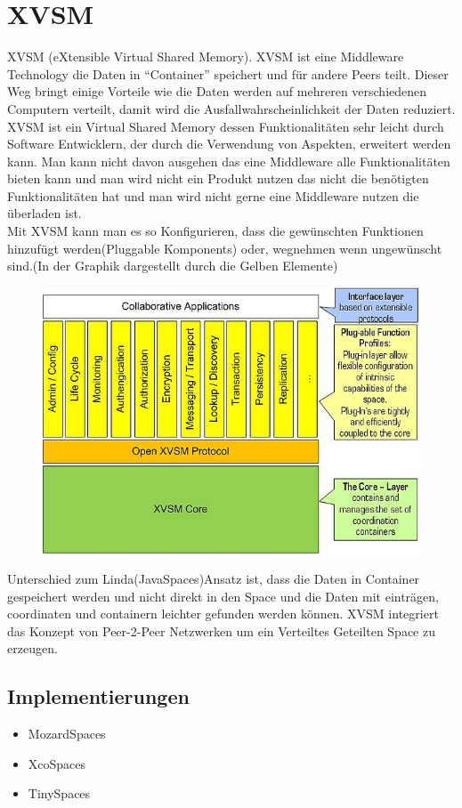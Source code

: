 \documentclass[a4paper,12pt]{scrreprt}
\begin{document}
		\section{XVSM}
		XVSM (eXtensible Virtual Shared Memory). XVSM ist eine Middleware Technology die Daten in “Container” speichert  und für andere Peers teilt. Dieser Weg bringt einige Vorteile wie die Daten werden auf mehreren verschiedenen Computern verteilt, damit wird die Ausfallwahrscheinlichkeit der Daten reduziert.\\
		
		XVSM ist ein Virtual Shared Memory dessen Funktionalitäten sehr leicht durch Software Entwicklern, der durch die Verwendung von Aspekten, erweitert werden kann. Man kann nicht davon ausgehen das eine Middleware alle Funktionalitäten bieten kann und man wird nicht ein Produkt nutzen das nicht die benötigten Funktionalitäten hat und man wird nicht gerne eine Middleware nutzen die überladen ist.\\
		Mit XVSM kann man es so Konfigurieren, dass die gewünschten Funktionen hinzufügt werden(Pluggable Komponents) oder, wegnehmen wenn ungewünscht sind.(In der Graphik dargestellt durch die Gelben Elemente)\\
		\begin{figure}[h]
\centering
\includegraphics[width=0.7\linewidth]{./08570620af}
\caption{}
\label{fig:08570620af}
\end{figure}

		
		Unterschied zum Linda(JavaSpaces)Ansatz ist, dass die Daten in Container gespeichert werden und nicht direkt in den Space und die Daten mit einträgen, coordinaten und containern leichter gefunden werden können.
		XVSM integriert das Konzept von Peer-2-Peer Netzwerken um ein Verteiltes Geteilten Space zu erzeugen.
		
		\subsection{Implementierungen}
			\begin{itemize}
			\item MozardSpaces
			\item XcoSpaces
			\item TinySpaces
			\end{itemize}
		
\end{document}
